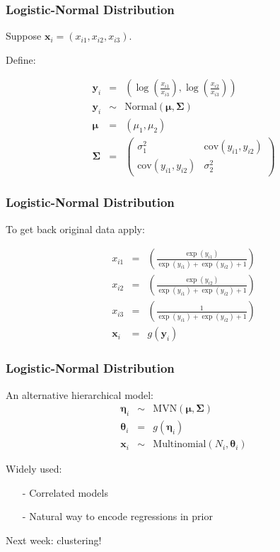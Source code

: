 \documentclass{beamer}
\numberwithin{equation}{section}
\begin{document}
\begin{frame}
\frametitle{Logistic-Normal Distribution}

Suppose $\boldsymbol{x}_{i} = (x_{i1}, x_{i2}, x_{i3})$.  

Define: 

\begin{eqnarray}
\boldsymbol{y}_{i} & = & \left(\log\left(\frac{x_{i1}}{x_{i3}}\right), \log\left(\frac{x_{i2}}{x_{i3}} \right)  \right ) \nonumber \\
\boldsymbol{y}_{i} & \sim & \text{Normal}(\boldsymbol{\mu}, \boldsymbol{\Sigma} )  \nonumber \\
\boldsymbol{\mu} & =  & (\mu_{1}, \mu_{2} ) \nonumber \\
\boldsymbol{\Sigma} &  = &  \begin{pmatrix} \sigma_{1}^{2} & \text{cov}(y_{i1}, y_{i2} ) \\
 \text{cov}(y_{i1}, y_{i2} ) & \sigma_{2}^{2}  \end{pmatrix}\nonumber 
\end{eqnarray} 


\end{frame}


\begin{frame}
\frametitle{Logistic-Normal Distribution}

To get back original data apply:

\begin{eqnarray}
x_{i1} & = & \left(\frac{\exp(y_{i1})}{\exp(y_{i1}) + \exp(y_{i2}) + 1}  \right) \nonumber \\
x_{i2} & = & \left(\frac{\exp(y_{i2})}{\exp(y_{i1}) + \exp(y_{i2}) + 1}  \right) \nonumber \\
x_{i3} & = & \left(\frac{1}{\exp(y_{i1}) + \exp(y_{i2}) + 1}  \right) \nonumber \\
\boldsymbol{x}_{i} & = & g(\boldsymbol{y}_{i} ) \nonumber 
\end{eqnarray}



\end{frame}


\begin{frame}
\frametitle{Logistic-Normal Distribution}

An alternative hierarchical model:
\begin{eqnarray}
\boldsymbol{\eta}_{i} & \sim & \text{MVN}(\boldsymbol{\mu}, \boldsymbol{\Sigma}) \nonumber \\
\boldsymbol{\theta}_{i} & = & g(\boldsymbol{\eta}_{i} ) \nonumber \\
\boldsymbol{x}_{i} & \sim & \text{Multinomial}(N_{i}, \boldsymbol{\theta}_{i}) \nonumber 
\end{eqnarray}

Widely used:
\begin{itemize}
\item[-] Correlated models
\item[-] Natural way to encode \alert{regressions} in prior
\end{itemize}


\end{frame}

\begin{frame}

Next week: clustering!

\end{frame}
\end{document}
